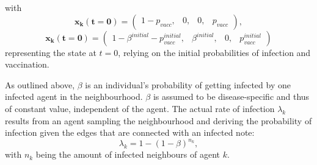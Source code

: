 \documentclass[11pt]{article}
\begin{document}
with 
\begin{equation}\label{eq:7}
	\mathbf{x_{k}(t=0)}=\left(\begin{array}{cccc} 1-p_{vacc},&0,&0,&p_{vacc}  \end{array} \right),
\end{equation} 
\begin{equation}\label{eq:7}
	\mathbf{x_{k}(t=0)}=\left(\begin{array}{cccc} 1-\beta^{initial}-p_{vacc}^{initial} ,&\beta^{initial},&0,&p_{vacc}^{initial}  \end{array} \right)
\end{equation} 
representing the state at \(t=0\), relying on the initial probabilities of infection and vaccination. 




As outlined above, \(\beta\) is an individual's probability of getting infected by one infected agent in the neighbourhood. \(\beta\) is assumed to be disease-specific and thus of constant value, independent of the agent. The actual rate of infection \(\lambda_{k}\) results from an agent sampling the neighbourhood and deriving the probability of infection given the edges that are connected with an infected note: 
\begin{equation}\label{eq:5}
	\lambda_{k}=1-(1-\beta)^{n_{k}},
\end{equation}
with \(n_{k}\) being the amount of infected neighbours of agent \(k\). %
\end{document}

